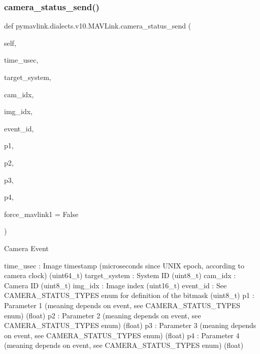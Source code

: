 \begin{DoxyVerb}
\begin{DoxyVerb}
\subsubsection{\texorpdfstring{camera\+\_\+status\+\_\+send()}{camera\_status\_send()}}
{\footnotesize\ttfamily def pymavlink.\+dialects.\+v10.\+M\+A\+V\+Link.\+camera\+\_\+status\+\_\+send (\begin{DoxyParamCaption}\item[{}]{self,  }\item[{}]{time\+\_\+usec,  }\item[{}]{target\+\_\+system,  }\item[{}]{cam\+\_\+idx,  }\item[{}]{img\+\_\+idx,  }\item[{}]{event\+\_\+id,  }\item[{}]{p1,  }\item[{}]{p2,  }\item[{}]{p3,  }\item[{}]{p4,  }\item[{}]{force\+\_\+mavlink1 = {\ttfamily False} }\end{DoxyParamCaption})}

\begin{DoxyVerb}Camera Event

time_usec                 : Image timestamp (microseconds since UNIX epoch, according to camera clock) (uint64_t)
target_system             : System ID (uint8_t)
cam_idx                   : Camera ID (uint8_t)
img_idx                   : Image index (uint16_t)
event_id                  : See CAMERA_STATUS_TYPES enum for definition of the bitmask (uint8_t)
p1                        : Parameter 1 (meaning depends on event, see CAMERA_STATUS_TYPES enum) (float)
p2                        : Parameter 2 (meaning depends on event, see CAMERA_STATUS_TYPES enum) (float)
p3                        : Parameter 3 (meaning depends on event, see CAMERA_STATUS_TYPES enum) (float)
p4                        : Parameter 4 (meaning depends on event, see CAMERA_STATUS_TYPES enum) (float)\end{DoxyVerb}
 \mbox{\label{classpymavlink_1_1dialects_1_1v10_1_1MAVLink_a119ac657ea0b7f8dfd435aa4762eda82}} 

\end{DoxyVerb}
\end{DoxyVerb}
